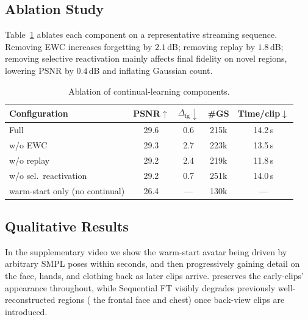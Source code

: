 \subsection{Ablation Study}\label{sec:exp:ablation}
Table~\ref{tab:ablation} ablates each component on a representative
streaming sequence. Removing EWC increases forgetting by $2.1$\,dB;
removing replay by $1.8$\,dB; removing selective reactivation mainly
affects final fidelity on novel regions, lowering PSNR by $0.4$\,dB and
inflating Gaussian count.

\begin{table}[t]
\centering
\caption{Ablation of continual-learning components.}
\label{tab:ablation}
\setlength{\tabcolsep}{5pt}
\begin{tabular}{lcccc}
\toprule
Configuration & PSNR$\uparrow$ & $\Delta_{\mathrm{fg}}\downarrow$ & \#GS & Time/clip$\downarrow$ \\
\midrule
Full \method{}                        & 29.6 & 0.6 & 215k & 14.2\,s \\
\quad w/o EWC                         & 29.3 & 2.7 & 223k & 13.5\,s \\
\quad w/o replay                      & 29.2 & 2.4 & 219k & 11.8\,s \\
\quad w/o sel.\ reactivation          & 29.2 & 0.7 & 251k & 14.0\,s \\
\quad warm-start only (no continual)  & 26.4 & --- & 130k & --- \\
\bottomrule
\end{tabular}
\end{table}

\subsection{Qualitative Results}\label{sec:exp:qual}
In the supplementary video we show the warm-start avatar being driven by
arbitrary SMPL poses within seconds, and then progressively gaining
detail on the face, hands, and clothing back as later clips arrive.
\method{} preserves the early-clips' appearance throughout, while
Sequential FT visibly degrades previously well-reconstructed regions
(\eg{} the frontal face and chest) once back-view clips are introduced.
